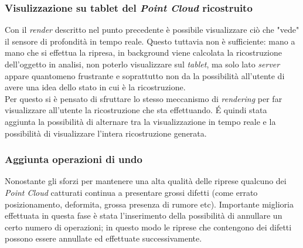 \subsubsection{Visulizzazione su tablet del \emph{Point Cloud} ricostruito}
Con il \emph{render} descritto nel punto precedente è possibile visualizzare ciò che "vede" il sensore di profondità in tempo reale. Questo tuttavia non è sufficiente: mano a mano che si effettua la ripresa, in background viene calcolata la ricostruzione dell'oggetto in analisi, non poterlo visualizzare sul \emph{tablet}, ma solo lato \emph{server} appare quantomeno frustrante e soprattutto non da la possibilità all'utente di avere una idea dello stato in cui è la ricostruzione. \\
Per questo si è pensato di sfruttare lo stesso meccanismo di \emph{rendering} per far visualizzare all'utente la ricostruzione che sta effettuando. É quindi stata aggiunta la possibilità di alternare tra la visualizzazione in tempo reale e la possibilità di visualizzare l'intera ricostruzione generata.


\subsubsection{Aggiunta operazioni di undo}
Nonostante gli sforzi per mantenere una alta qualità delle riprese qualcuno dei \emph{Point Cloud} catturati continua a presentare grossi difetti (come errato posizionamento, deformita, grossa presenza di rumore etc).
Importante miglioria effettuata in questa fase è stata l'inserimento della possibilità di annullare un certo numero di operazioni; in questo modo le riprese che contengono dei difetti possono essere annullate ed effettuate successivamente.

